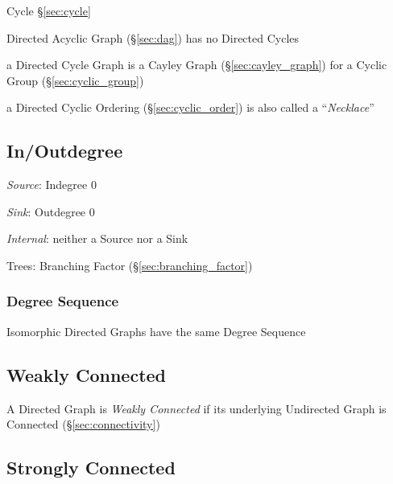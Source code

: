 Cycle \S\ref{sec:cycle}

Directed Acyclic Graph (\S\ref{sec:dag}) has no Directed Cycles

a Directed Cycle Graph is a Cayley Graph (\S\ref{sec:cayley_graph})
for a Cyclic Group (\S\ref{sec:cyclic_group})

a Directed Cyclic Ordering (\S\ref{sec:cyclic_order}) is also called a
``\emph{Necklace}''



\subsection{In/Outdegree}\label{sec:inoutdegree}

\emph{Source}: Indegree $0$

\emph{Sink}: Outdegree $0$

\emph{Internal}: neither a Source nor a Sink


Trees: Branching Factor (\S\ref{sec:branching_factor})



\subsubsection{Degree Sequence}\label{sec:degree_sequence}

Isomorphic Directed Graphs have the same Degree Sequence



\subsection{Weakly Connected}\label{sec:weakly_connected}

A Directed Graph is \emph{Weakly Connected} if its underlying
Undirected Graph is Connected (\S\ref{sec:connectivity})



\subsection{Strongly Connected}\label{sec:strongly_connected}

